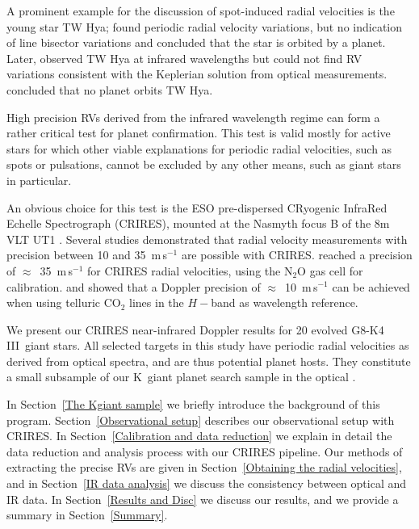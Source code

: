 \documentclass{aa}
\begin{document}
A prominent example for the discussion of spot-induced radial velocities is the young star TW Hya; \citet{Setiawan2008} found 
periodic radial velocity variations, but no indication of line bisector variations and concluded that 
the star is orbited by a planet. 
Later, \citet{Huelamo} observed TW Hya at infrared wavelengths but could 
not find RV variations consistent with the Keplerian solution from 
optical measurements. \citet{Huelamo} concluded that no planet orbits TW Hya.

High precision RVs derived from the infrared wavelength regime can form a rather critical test for planet confirmation. 
This test is valid mostly for active stars for which other viable explanations for periodic 
radial velocities, such as spots or pulsations, cannot be excluded by any other means, such as giant stars in particular.

An obvious choice for this test is the ESO pre-dispersed CRyogenic InfraRed Echelle Spectrograph (CRIRES),
mounted at the Nasmyth focus B of the 8m VLT UT1 \citep{Kaeufl}.
Several studies  demonstrated that radial velocity measurements with precision 
between 10 and 35~m\,s$^{-1}$ are possible with CRIRES.
\citet{Seifahrt} reached a precision of $\approx$~35~m\,s$^{-1}$ for CRIRES radial velocities, using the 
N$_2$O gas cell for calibration. \citet{Huelamo} and \citet{Figueira} showed that a Doppler precision of 
$\approx$~10~m\,s$^{-1}$ can be achieved when using telluric CO$_2$ lines in the $H-$band as wavelength reference.
 

We present our CRIRES near-infrared Doppler results for 20 evolved G8-K4\,III~giant stars.
All selected targets in this study have periodic radial velocities as derived from optical spectra, and are thus potential planet hosts. 
They constitute a small subsample of our K~giant planet search sample in the optical \citep{Frink, Reffert2014}. 


In Section~\ref{The Kgiant sample} we briefly introduce the background of this program.  
Section~\ref{Observational setup} describes our observational setup with CRIRES. 
In Section~\ref{Calibration and data reduction} we explain in detail the data reduction and analysis process with our CRIRES pipeline.
Our methods of extracting the precise RVs are given in Section~\ref{Obtaining the radial velocities}, and in Section~\ref{IR data analysis}
we discuss the consistency between optical and IR data. In Section~\ref{Results and Disc} we 
discuss our results, and we provide a summary in Section~\ref{Summary}.
\end{document}
